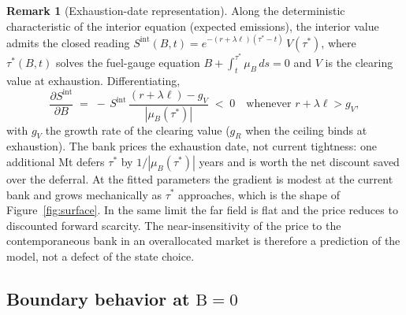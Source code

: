 \documentclass[11pt,letterpaper]{article}
\theoremstyle{plain}
\theoremstyle{definition}
\newtheorem{remark}[theorem]{Remark}
\numberwithin{equation}{section}
\begin{document}
\begin{remark}[Exhaustion-date representation]\label{rem:taustar}
Along the deterministic characteristic of the interior equation (expected emissions), the interior value admits the closed reading $S^{\mathrm{int}}(B,t)=e^{-(r+\lambda\ell)(\tau^{*}-t)}\,V(\tau^{*})$, where $\tau^{*}(B,t)$ solves the fuel-gauge equation $B+\int_{t}^{\tau^{*}}\mu_B\,ds=0$ and $V$ is the clearing value at exhaustion. Differentiating,
\[
\frac{\partial S^{\mathrm{int}}}{\partial B}\;=\;-\,S^{\mathrm{int}}\,\frac{(r+\lambda\ell)-g_V}{|\mu_B(\tau^{*})|}\;<\;0
\quad\text{whenever } r+\lambda\ell>g_V,
\]
with $g_V$ the growth rate of the clearing value ($g_R$ when the ceiling binds at exhaustion). The bank prices the exhaustion date, not current tightness: one additional Mt defers $\tau^{*}$ by $1/|\mu_B(\tau^{*})|$ years and is worth the net discount saved over the deferral. At the fitted parameters the gradient is modest at the current bank and grows mechanically as $\tau^{*}$ approaches, which is the shape of Figure~\ref{fig:surface}. In the same limit the far field is flat and the price reduces to discounted forward scarcity. The near-insensitivity of the price to the contemporaneous bank in an overallocated market is therefore a prediction of the model, not a defect of the state choice.
\end{remark}

\subsection{Boundary behavior at \texorpdfstring{\(\mathrm{B}=0\)}{B=0}}\label{sec:boundary}
\end{document}

